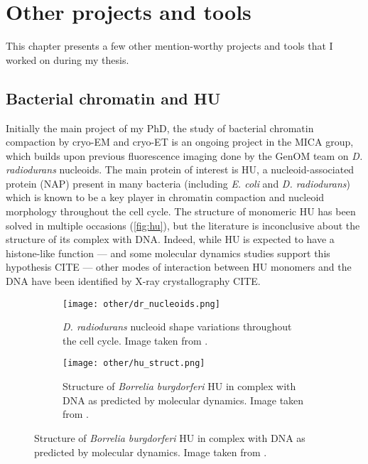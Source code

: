 \chapter{Other projects and tools}\label{other_projects}

This chapter presents a few other mention-worthy projects and tools that I worked on during my thesis.

\localtableofcontents

\section{Bacterial chromatin and HU}

Initially the main project of my PhD, the study of bacterial chromatin compaction by cryo-EM and cryo-ET is an ongoing project in the MICA group, which builds upon previous fluorescence imaging done by the GenOM team on \textit{D. radiodurans} nucleoids.
The main protein of interest is HU, a nucleoid-associated protein (NAP) present in many bacteria (including \textit{E. coli} and \textit{D. radiodurans}) which is known to be a key player in chromatin compaction and nucleoid morphology throughout the cell cycle.
The structure of monomeric HU has been solved in multiple occasions (\autoref{fig:hu}), but the literature is inconclusive about the structure of its complex with DNA.
Indeed, while HU is expected to have a histone-like function --- and some molecular dynamics studies support this hypothesis CITE --- other modes of interaction between HU monomers and the DNA have been identified by X-ray crystallography CITE.

\begin{figure}[ht]
    \centering
    \begin{subfigure}[B]{.48\textwidth}
        \centering
        \texttt{[image: other/dr\_nucleoids.png]}
        \caption{\textit{D. radiodurans} nucleoid shape variations throughout the cell cycle. Image taken from \citet{flochCellMorphologyNucleoid2019}.}
        \label{fig:hu_nucleoids}
    \end{subfigure}%
    \hfill
    \begin{subfigure}[B]{.5\textwidth}
        \centering
        \texttt{[image: other/hu\_struct.png]}
        \caption{Structure of \textit{Borrelia burgdorferi} HU in complex with DNA as predicted by molecular dynamics. Image taken from \citet{hognonMolecularBasesDNA2019}.}
        \label{fig:hu_structure}
    \end{subfigure}%
    \label{fig:hu}
\end{figure}

